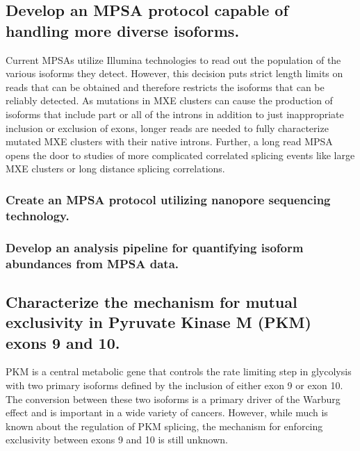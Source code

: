 \documentclass{article}
\begin{document}
\subsection{Develop an MPSA protocol capable of handling more diverse isoforms.}
Current MPSAs utilize Illumina technologies to read out the population of the various isoforms they detect.\cite{Ke2018-af, Julien2016-wa, Adamson2018-va, Soemedi2017-pz, Cortes-Lopez2022-gy, Schirman2021-ss, Mikl2019-ng, Braun2018-mb, Soucek2019-iq, Baeza-Centurion2020-tn, Cheung2019-ah, Baeza-Centurion2019-hz, Rosenberg2015-zs, Wong2018-vq} 
However, this decision puts strict length limits on reads that can be obtained and therefore restricts the isoforms that can be reliably detected.
As mutations in MXE clusters can cause the production of isoforms that include part or all of the introns in addition to just inappropriate inclusion or exclusion of exons,\cite{Wang2012-dr} longer reads are needed to fully characterize mutated MXE clusters with their native introns. 
Further, a long read MPSA opens the door to studies of more complicated correlated splicing events like large MXE clusters\cite{Hatje2017-oj} or long distance splicing correlations.\cite{Zhu2021-fs, Tilgner2015-sb, Tilgner2018-jo}
%
\subsubsection{Create an MPSA protocol utilizing nanopore sequencing technology.} \label{aim:nanopore_screen_dev}
%
\subsubsection{Develop an analysis pipeline for quantifying isoform abundances from MPSA data.} \label{aim:pipeline_QC}
%
\subsection{Characterize the mechanism for mutual exclusivity in Pyruvate Kinase M (PKM) exons 9 and 10.}
PKM is a central metabolic gene that controls the rate limiting step in glycolysis with two primary isoforms defined by the inclusion of either exon 9 or exon 10. 
The conversion between these two isoforms is a primary driver of the Warburg effect and is important in a wide variety of cancers.\Cite{Christofk2008-bu,Ma2022-dt} 
However, while much is known about the regulation of PKM splicing, the mechanism for enforcing exclusivity between exons 9 and 10 is still unknown.
%
\end{document}
